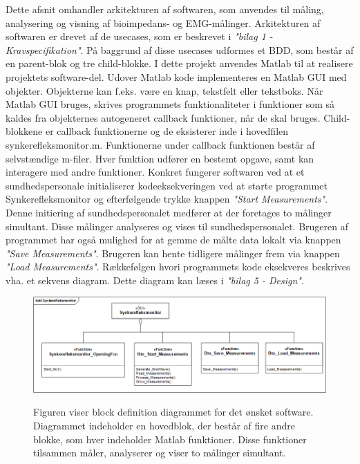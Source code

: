 Dette afsnit omhandler arkitekturen af softwaren, som anvendes til måling, analysering og visning af bioimpedans- og EMG-målinger. Arkitekturen af softwaren er drevet af de usecases, som er beskrevet i \textit{"bilag 1 - Kravspecifikation"}. På baggrund af disse usecases udformes et BDD, som består af en parent-blok og tre child-blokke. I dette projekt anvendes  Matlab til at realisere projektets  software-del. Udover Matlab kode implementeres en Matlab GUI med objekter. Objekterne kan f.eks. være en knap, tekstfelt eller tekstboks. Når Matlab GUI bruges, skrives programmets funktionaliteter i funktioner som så kaldes fra objekternes autogeneret callback funktioner, når de skal bruges. Child-blokkene er callback funktionerne og de eksisterer inde i hovedfilen synkerefleksmonitor.m. Funktionerne under callback funktionen består af selvstændige m-filer. Hver funktion udfører en bestemt opgave, samt kan interagere med andre funktioner. Konkret fungerer softwaren ved at et sundhedspersonale initialiserer kodeeksekveringen ved at starte programmet Synkerefleksmonitor og efterfølgende trykke knappen \textit{"Start Measurements"}. Denne initiering af sundhedspersonalet medfører at der foretages to målinger simultant. Disse målinger analyseres og vises til sundhedspersonalet. Brugeren af programmet har også mulighed for at gemme de målte data lokalt via knappen \textit{"Save Measurements"}. Brugeren kan hente tidligere  målinger frem via knappen \textit{"Load Measurements"}. Rækkefølgen hvori programmets kode eksekveres beskrives vha. et sekvens diagram. Dette diagram kan læses i \textit{"bilag 5 - Design"}.    

\begin{figure}[H] 
\centering
{\includegraphics[width=\linewidth]
{Figure/SWIBD}}
\caption{Figuren viser block definition diagrammet for det ønsket software. Diagrammet indeholder en hovedblok, der består af fire andre blokke, som hver indeholder Matlab funktioner. Disse funktioner tilsammen måler, analyserer og viser to målinger simultant.}
\label{figScrip}
\end{figure}


\citep{Aroom2009}

